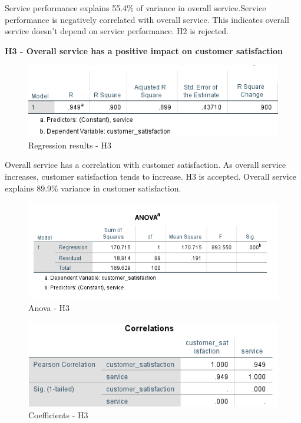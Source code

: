 \documentclass[a4paper, 12pt]{extarticle}
\begin{document}
{Service performance explains 55.4\% of variance in overall service.Service performance is negatively correlated with overall service. This indicates overall service doesn't depend on service performance. H2 is rejected.
\newpage
\par \textbf{H3 - Overall service has a positive impact on customer satisfaction}\\
\begin{figure}[H]
\centering
\includegraphics[scale=1]{sp_vs_cs.png}
\caption{Regression results - H3}
\end{figure}

Overall service has a correlation with customer satisfaction. As overall service increases, customer satisfaction tends to increase. H3 is accepted.
Overall service explains 89.9\% variance in customer satisfaction.

\begin{figure}[H]
\centering
\includegraphics[scale=1]{anova_css.png}
\caption{Anova - H3}
\end{figure}

\begin{figure}[H]
\centering
\includegraphics[scale=1]{h3.png}
\caption{Coefficients - H3}
\end{figure}

}
\end{document}
